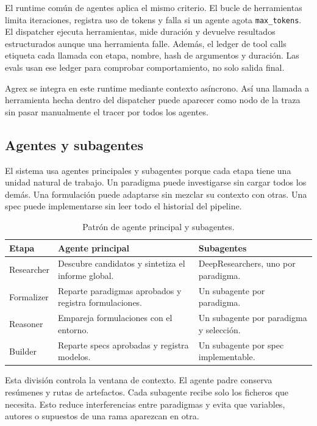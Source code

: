 El runtime común de agentes aplica el mismo criterio. El bucle de herramientas
limita iteraciones, registra uso de tokens y falla si un agente agota
\texttt{max\_tokens}. El dispatcher ejecuta herramientas, mide duración y
devuelve resultados estructurados aunque una herramienta falle. Además, el
ledger de tool calls etiqueta cada llamada con etapa, nombre, hash de argumentos
y duración. Las evals usan ese ledger para comprobar comportamiento, no solo
salida final.

Agrex se integra en este runtime mediante contexto asíncrono. Así una llamada a
herramienta hecha dentro del dispatcher puede aparecer como nodo de la traza
sin pasar manualmente el tracer por todos los agentes.

\subsection{Agentes y subagentes}

El sistema usa agentes principales y subagentes porque cada etapa tiene una
unidad natural de trabajo. Un paradigma puede investigarse sin cargar todos los
demás. Una formulación puede adaptarse sin mezclar su contexto con otras. Una
spec puede implementarse sin leer todo el historial del pipeline.

\begin{table}[H]
\begin{center}
\small
\begin{tabular}{|p{3.2cm}|p{4.6cm}|p{4.7cm}|} \hline
\textbf{Etapa} & \textbf{Agente principal} & \textbf{Subagentes} \\ \hline
Researcher & Descubre candidatos y sintetiza el informe global. & DeepResearchers, uno por paradigma. \\ \hline
Formalizer & Reparte paradigmas aprobados y registra formulaciones. & Un subagente por paradigma. \\ \hline
Reasoner & Empareja formulaciones con el entorno. & Un subagente por paradigma y selección. \\ \hline
Builder & Reparte specs aprobadas y registra modelos. & Un subagente por spec implementable. \\ \hline
\end{tabular}
\caption{Patrón de agente principal y subagentes.}
\end{center}
\end{table}

Esta división controla la ventana de contexto. El agente padre conserva
resúmenes y rutas de artefactos. Cada subagente recibe solo los ficheros que
necesita. Esto reduce interferencias entre paradigmas y evita que variables,
autores o supuestos de una rama aparezcan en otra.

